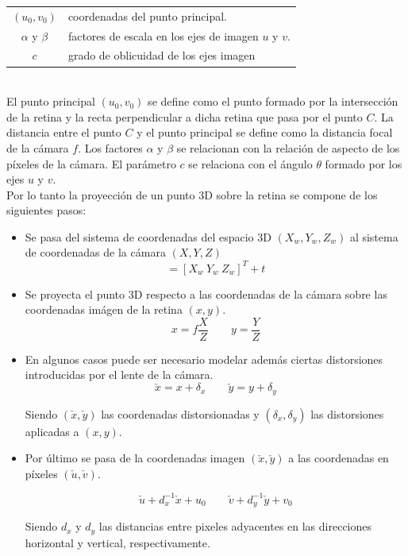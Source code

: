 \begin{tabular}{cp{}}


$(u_0, v_0)$ &  coordenadas del punto principal. \\ 
$\alpha$ y $\beta$ & factores de escala en los ejes de imagen  $u$ y $v$. \\ 
$c$ & grado de oblicuidad de los ejes imagen
\end{tabular} \\

El punto principal $(u_0, v_0)$ se define como el punto formado por la intersección de la retina y la recta perpendicular a dicha retina que pasa por el punto $C$. La distancia entre el punto $C$ y el punto principal se define como la distancia focal de la cámara $f$. Los factores $\alpha$ y $\beta$ se relacionan con la relación de aspecto de los píxeles de la cámara. El parámetro $c$ se relaciona con el ángulo $\theta$ formado por los ejes $u$ y $v$.\\

Por lo tanto la proyección de un punto 3D sobre la retina se compone de los siguientes pasos:\\

\begin{itemize}
\item Se pasa del sistema de coordenadas del espacio 3D $(X_w, Y_w, Z_w)$ al sistema de coordenadas de la cámara $(X,Y, Z)$
\begin{equation}
[X \ Y \ Z] = [X_w \ Y_w \ Z_w]^T + t
\end{equation}
\item Se proyecta el punto 3D respecto a las coordenadas de la cámara sobre las coordenadas imágen de la retina $(x,y)$.
\begin{equation}
x=f \dfrac{X}{Z} \qquad y = \dfrac{Y}{Z}
\end{equation}
\item En algunos casos puede ser necesario modelar además ciertas distorsiones introducidas por el lente de la cámara.
\begin{equation}
\check{x} = x + \delta_x \qquad \check{y} = y + \delta_y
\end{equation}

Siendo $(\check{x},\check{y})$ las coordenadas distorsionadas y $(\delta_x, \delta_y)$ las distorsiones aplicadas a $(x,y)$.

\item Por último se pasa de la coordenadas imagen $(\check{x}, \check{y})$ a las coordenadas en píxeles $(\check{u}, \check{v})$.

\begin{equation}
\check{u} + d_x ^{-1}\check{x} + u_0 \qquad \check{v} + d_y ^{-1}\check{y} + v_0
\end{equation}

Siendo $d_x$ y $d_y$ las distancias entre pixeles adyacentes en las direcciones horizontal y vertical, respectivamente.\\
\end{itemize}


